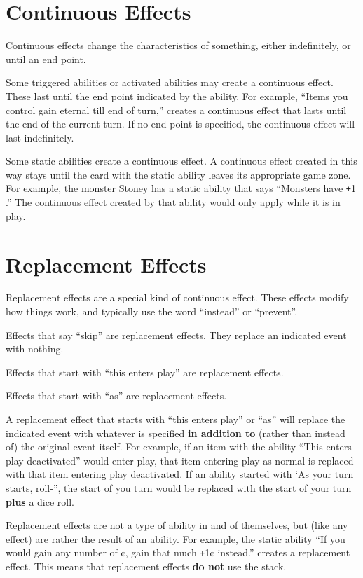\documentclass[
  fontsize=10pt,
  paper=a5,
  version=last,
  chapterprefix=true,
  bindingoffset=5mm,
  ]{scrbook}
\newcommand*{\inlineicon}[1]{%
    \raisebox{-.3\baselineskip}{%
        \smash{%
            \texttt{[image: \#1]}%
        }%
    }%
}
\newcommand{\dice}{\inlineicon{./assets/ms-dice.png}}
\def\plus{\texttt{+}}
\begin{document}
    \section{Continuous Effects}
    Continuous effects change the characteristics of something, either indefinitely, or until an end point.

    Some triggered abilities or activated abilities may create a continuous effect. These last until the end point indicated by the ability. For example, “Items you control gain eternal till end of turn,” creates a continuous effect that lasts until the end of the current turn. If no end point is specified, the continuous effect will last indefinitely.

    Some static abilities create a continuous effect. A continuous effect created in this way stays until the card with the static ability leaves its appropriate game zone. For example, the monster Stoney has a static ability that says “Monsters have \plus1 \dice.” The continuous effect created by that ability would only apply while it is in play.

    \section{Replacement Effects}
    Replacement effects are a special kind of continuous effect. These effects modify how things work, and typically use the word “instead” or “prevent”.

    Effects that say “skip” are replacement effects. They replace an indicated event with nothing.

    Effects that start with “this enters play” are replacement effects.

    Effects that start with “as” are replacement effects.

    A replacement effect that starts with “this enters play” or “as” will replace the indicated event with whatever is specified \textbf{in addition to} (rather than instead of) the original event itself. For example, if an item with the ability “This enters play deactivated” would enter play, that item entering play as normal is replaced with that item entering play deactivated. If an ability started with ‘As your turn starts, roll-”, the start of you turn would be replaced with the start of your turn \textbf{plus} a dice roll.

    Replacement effects are not a type of ability in and of themselves, but (like any effect) are rather the result of an ability. For example, the static ability “If you would gain any number of ¢, gain that much \plus1¢ instead.” creates a replacement effect. This means that replacement effects \textbf{do not} use the stack.
\end{document}
